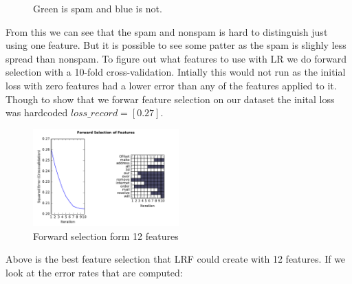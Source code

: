 \documentclass[11pt, paper=a4]{article}
\begin{document}
\begin{figure}[h]
\begin{minipage}{0.3\textwidth}
  \end{minipage} \vfill
  \caption{\label{fig:modelcheck} Green is spam and blue is not.}
\end{figure}

From this we can see that the spam and nonspam is hard to distinguish
just using one feature. But it is possible to see some patter as the
spam is slighly less spread than nonspam.
\newpage
To figure out what features to use with LR we do forward selection
with a 10-fold cross-validation. Intially this would not run as the
initial loss with zero features had a lower error than any of the
features applied to it. Though to show that we forwar feature
selection on our dataset the inital loss was hardcoded
$loss\_record=[0.27]$.

\begin{figure}[h]
  \centering
  \includegraphics[width = 0.5\textwidth]{../../src/img/best_forward_selection.pdf}
  \caption{Forward selection form 12 features}
  \label{fig:gam}
\end{figure}

Above is the best feature selection that LRF could create with 12
features.  If we look at the error rates that are
computed:
\end{document}
